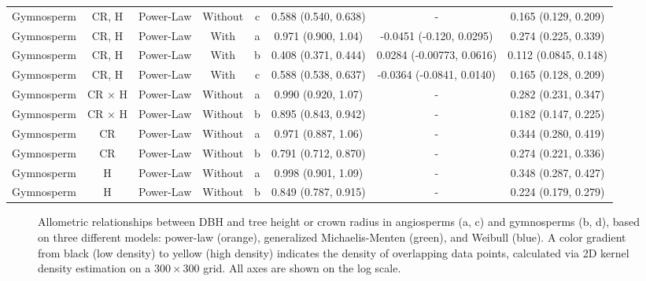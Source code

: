 \documentclass[
  12pt,
  letterpaper,
  DIV=11,
  numbers=noendperiod]{scrartcl}
\makeatletter
\newcommand*\pandocbounded[1]{%
  \sbox\pandoc@box{#1}%
  \Gscale@div\@tempa{\textheight}{\dimexpr\ht\pandoc@box+\dp\pandoc@box\relax}%
  \Gscale@div\@tempb{\linewidth}{\wd\pandoc@box}%
  \ifdim\@tempb\p@<\@tempa\p@\let\@tempa\@tempb\fi%
  \ifdim\@tempa\p@<\p@\scalebox{\@tempa}{\usebox\pandoc@box}%
  \else\usebox{\pandoc@box}%
  \fi%
}
\makeatother
\begin{document}
\begin{longtable*}[t]{cccccccc}
Gymnosperm & CR, H & Power-Law & Without & c & 0.588 (0.540, 0.638) & - & 0.165 (0.129, 0.209)\\
\addlinespace
Gymnosperm & CR, H & Power-Law & With & a & 0.971 (0.900, 1.04) & -0.0451 (-0.120, 0.0295) & 0.274 (0.225, 0.339)\\
Gymnosperm & CR, H & Power-Law & With & b & 0.408 (0.371, 0.444) & 0.0284 (-0.00773, 0.0616) & 0.112 (0.0845, 0.148)\\
Gymnosperm & CR, H & Power-Law & With & c & 0.588 (0.538, 0.637) & -0.0364 (-0.0841, 0.0140) & 0.165 (0.128, 0.209)\\
Gymnosperm & CR × H & Power-Law & Without & a & 0.990 (0.920, 1.07) & - & 0.282 (0.231, 0.347)\\
Gymnosperm & CR × H & Power-Law & Without & b & 0.895 (0.843, 0.942) & - & 0.182 (0.147, 0.225)\\
\addlinespace
Gymnosperm & CR & Power-Law & Without & a & 0.971 (0.887, 1.06) & - & 0.344 (0.280, 0.419)\\
Gymnosperm & CR & Power-Law & Without & b & 0.791 (0.712, 0.870) & - & 0.274 (0.221, 0.336)\\
Gymnosperm & H & Power-Law & Without & a & 0.998 (0.901, 1.09) & - & 0.348 (0.287, 0.427)\\
Gymnosperm & H & Power-Law & Without & b & 0.849 (0.787, 0.915) & - & 0.224 (0.179, 0.279)\\
\bottomrule
\end{longtable*}
\endgroup{}

\newpage

\begin{figure}[H]

\centering{

\pandocbounded{\texttt{[image: ../figs/h\_cr\_dbh\_log.png]}}

}

\caption{\label{fig-compare}Allometric relationships between DBH and
tree height or crown radius in angiosperms (a, c) and gymnosperms (b,
d), based on three different models: power-law (orange), generalized
Michaelis-Menten (green), and Weibull (blue). A color gradient from
black (low density) to yellow (high density) indicates the density of
overlapping data points, calculated via 2D kernel density estimation on
a 300\,\(\times\)\,300 grid. All axes are shown on the log scale.}

\end{figure}%

\newpage
\end{document}

